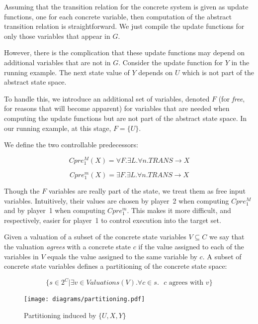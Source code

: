 Assuming that the transition relation for the concrete system is given as update functions, one for each concrete variable, then computation of the abstract transition relation is straightforward. We just compile the update functions for only those variables that appear in $G$.

However, there is the complication that these update functions may depend on additional variables that are not in $G$. Consider the update function for $Y$ in the running example. The next state value of $Y$ depends on $U$ which is not part of the abstract state space.

To handle this, we introduce an additional set of variables, denoted $F$ (for \emph{free}, for reasons that will become apparent) for variables that are needed when computing the update functions but are not part of the abstract state space. In our running example, at this stage, $F=\{U\}$.

We define the two controllable predecessors:

\begin{equation}
    \label{eqn:symb_cpre_M}
    Cpre_1^M(X) = \forall F. \exists L. \forall n. TRANS \rightarrow X
\end{equation}

\begin{equation}
    \label{eqn:symb_cpre_m}
    Cpre_1^m(X) = \exists F. \exists L. \forall n. TRANS \rightarrow X
\end{equation}

Though the $F$ variables are really part of the state, we treat them as free input variables. Intuitively, their values are chosen by player~2 when computing $Cpre_1^M$ and by player~1 when computing $Cpre_1^m$. This makes it more difficult, and respectively, easier for player~1 to control execution into the target set.

Given a valuation of a subset of the concrete state variables $V \subseteq C$ we say that the valuation \emph{agrees} with a concrete state $c$ if the value assigned to each of the variables in $V$ equals the value assigned to the same variable by $c$. A subset of concrete state variables defines a partitioning of the concrete state space: 

\begin{equation}
    \{ s \in 2^C | \exists v \in Valuations(V). \forall c \in s. \text{ $c$ agrees with $v$} \}
\end{equation}

\begin{figure}
\centering
\texttt{[image: diagrams/partitioning.pdf]}
\caption{Partitioning induced by $\{U, X, Y\}$}
\label{fig:f_partitioning}
\end{figure}

